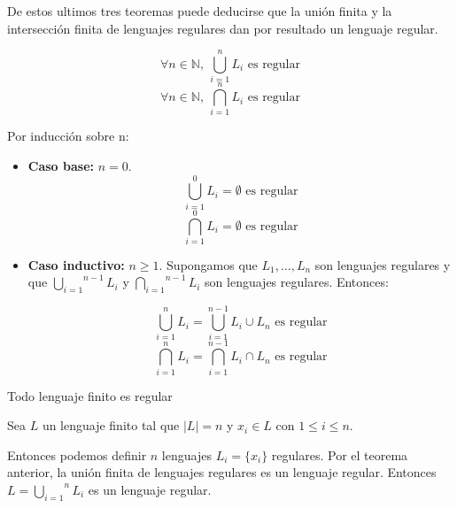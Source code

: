 \begin{teorema}
  De estos ultimos tres teoremas puede deducirse que la unión finita y la intersección finita de lenguajes regulares dan por resultado un lenguaje regular.

  \[
    \forall n\in\mathbb{N},~\bigcup_{i=1}^n L_i \text{ es regular}
  \]
  \[
    \forall n\in\mathbb{N},~\bigcap_{i=1}^n L_i \text{ es regular}
  \]
\end{teorema}

\begin{demo}[0.8\textwidth]
  Por inducción sobre n:
  \begin{itemize}
    \item[] \textbf{Caso base:} \(n=0\). \[
        \bigcup_{i=1}^0 L_i = \emptyset \text{ es regular}
      \]
      \[ \bigcap_{i=1}^0 L_i  = \emptyset \text{ es regular}\]
    \item \textbf{Caso inductivo:} \(n\geq 1\). Supongamos que \(L_1,\dots,L_n\) son lenguajes regulares y que \(\overset{n-1}{\underset{i=1}{\bigcup}} L_i\) y \(\overset{n-1}{\underset{i=1}{\bigcap}} L_i\) son lenguajes regulares. Entonces:

          \[ \bigcup_{i=1}^{n} L_i = \bigcup_{i=1}^{n-1} L_i \cup L_n \text{ es regular}\]
          \[ \bigcap_{i=1}^{n} L_i = \bigcap_{i=1}^{n-1} L_i \cap L_n \text{ es regular}\]
  \end{itemize}
\end{demo}
\begin{teorema}
  Todo lenguaje finito es regular
\end{teorema}
\begin{demo}[0.8\textwidth]
  Sea \(L\) un lenguaje finito tal que \(|L| = n\) y \(x_i \in L\) con \(1 \leq i \leq n\).

  Entonces podemos definir \(n\) lenguajes \(L_i = \{ x_i \} \) regulares. Por el teorema anterior, la unión finita de lenguajes regulares es un lenguaje regular. Entonces \(L = \overset{n}{\underset{i=1}{\bigcup}} L_i\) es un lenguaje regular.
\end{demo}

\newpage
